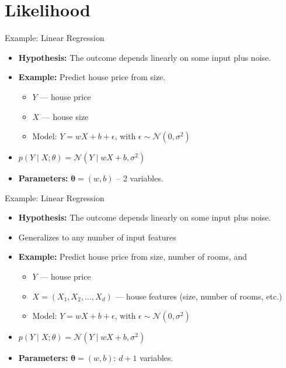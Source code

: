 \documentclass{beamer}
\begin{document}
\section{Likelihood}

\begin{frame}{Example: Linear Regression}
  \begin{itemize}
    \item \textbf{Hypothesis:} The outcome depends linearly on some input plus noise.
    \item \textbf{Example:} Predict house price from size.
      \begin{itemize}
        \item $Y$ — house price
        \item $X$ — house size
        \item Model: $Y = wX + b + \epsilon$, with $\epsilon \sim \mathcal{N}(0, \sigma^2)$
      \end{itemize}
    \item $p(Y \mid X; \theta) = \mathcal{N}(Y \mid wX + b, \sigma^2)$
    \item \textbf{Parameters:} $\mathbf{\theta} = (w, b)$ -- 2 variables.
  \end{itemize}
\end{frame}

\begin{frame}{Example: Linear Regression}
  \begin{itemize}
  \item \textbf{Hypothesis:} The outcome depends linearly on some input plus noise.
  \item Generalizes to any number of input features

    \item \textbf{Example:} Predict house price from size, number of rooms, and
      \begin{itemize}
        \item $Y$ — house price
        \item $X = (X_1, X_2, \ldots, X_d)$ — house features (size, number of rooms, etc.)
        \item Model: $Y = wX + b + \epsilon$, with $\epsilon \sim \mathcal{N}(0, \sigma^2)$
        \end{itemize}
    \item $p(Y \mid X; \theta) = \mathcal{N}(Y \mid wX + b, \sigma^2)$
    \item \textbf{Parameters:} $\mathbf{\theta} = (w, b)$: $d+1$ variables.

  \end{itemize}
\end{frame}
\end{document}

